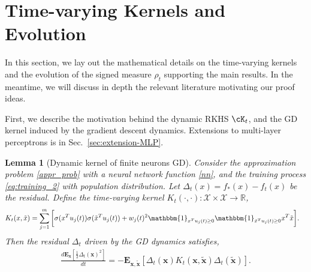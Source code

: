 \documentclass[11pt]{article}
\numberwithin{equation}{section}
\newtheorem{lemma}{Lemma}[section]
\def\bd#1{\mathbf{#1}}
\begin{document}

\section{Time-varying Kernels and Evolution}    
\label{sec:kernel}

In this section, we lay out the mathematical details on the time-varying kernels and the evolution of the signed measure $\rho_t$ supporting the main results. In the meantime, we will discuss in depth the relevant literature motivating our proof ideas. 


First, we describe the motivation behind the dynamic RKHS $\cK_t$, and the GD kernel induced by the gradient descent dynamics. Extensions to multi-layer perceptrons is in Sec.~\ref{sec:extension-MLP}.
     \begin{lemma}[Dynamic kernel of finite neurons GD]
        \label{lem:dynamic-kernel}
        Consider the approximation problem \eqref{appr_prob} with a neural network function \eqref{nn}, and the training process \eqref{eq:training_2} with population distribution. Let $\Delta_t(x) = f_*(x)-f_t(x)$ be the residual. Define the time-varying kernel $K_t(\cdot, \cdot): \mathcal{X} \times \mathcal{X} \rightarrow \mathbb{R}$,
        \begin{align}\label{def:gd-kernel}
        K_t(x ,\tilde x) &=  \sum_{j=1}^m \bigg[\sigma(x^Tu_j(t))\sigma(\tilde x^Tu_j(t))  + w_j(t)^2\mathbbm{1}_{x^Tu_j(t)\geq0}\mathbbm{1}_{\tilde x^Tu_j(t)\geq0}x^T\tilde x \bigg].
        \end{align} 
        Then the residual $\Delta_t$ driven by the GD dynamics satisfies,
        \begin{align}
            \frac{d\mathbf{E}_{ \bd{ x}}\left[\frac{1}{2}\Delta_t(\bd{x})^2\right]}{dt} =  -\mathbf{E}_{\bd{x}, \bd{\tilde x}}\left[ \Delta_t(\bd{x})K_t(\bd{x}, \bd{\tilde x})\Delta_t(\bd{\tilde x})\right] .
        \end{align}
    \end{lemma}
    
\end{document}
